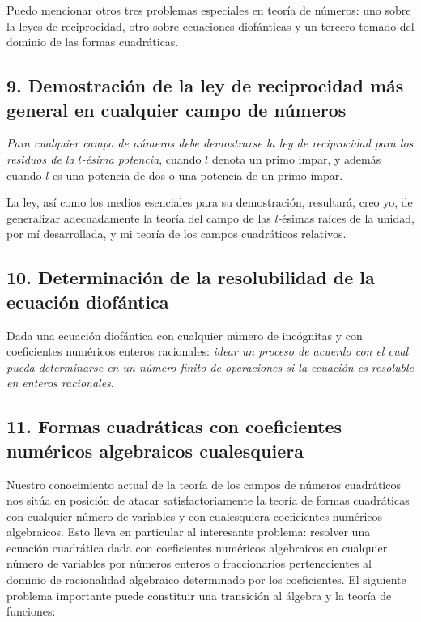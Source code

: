 \documentclass[a4paper, 12pt]{article}
\begin{document}
Puedo mencionar otros tres problemas especiales en teoría de números: uno sobre la leyes de reciprocidad, otro sobre ecuaciones diofánticas y un tercero tomado del dominio de las formas cuadráticas.


\subsection*{9. Demostración de la ley de reciprocidad más general en cualquier campo de números}


\textit{Para cualquier campo de números debe demostrarse la ley de reciprocidad para los residuos de la $l$-ésima potencia}, cuando $l$ denota un primo impar, y además cuando $l$ es una potencia de dos o una potencia de un primo impar.

La ley, así como los medios esenciales para su demostración, resultará, creo yo, de generalizar adecuadamente la teoría del campo de las $l$-ésimas raíces de la unidad, por mí desarrollada, y mi teoría de los campos cuadráticos relativos.

\subsection*{10. Determinación de la resolubilidad de la ecuación diofántica}

Dada una ecuación diofántica con cualquier número de incógnitas y con coeficientes numéricos enteros racionales: \textit{idear un proceso de acuerdo con el cual pueda determinarse en un número finito de operaciones si la ecuación es resoluble en enteros racionales}.

\subsection*{11. Formas cuadráticas con coeficientes numéricos
algebraicos cualesquiera}

Nuestro conocimiento actual de la teoría de los campos de números cua\-drá\-ticos nos sitúa en posición de atacar satisfactoriamente la teoría de formas cuadráticas con cualquier número de variables y con cualesquiera coeficientes numéricos algebraicos. Esto lleva en particular al interesante problema: resolver una ecuación cuadrática dada con coeficientes numéricos algebraicos en cualquier número de variables por números enteros o fraccionarios pertenecientes al dominio de racionalidad algebraico determinado por los coeficientes.
El siguiente problema importante puede constituir una transición al
álgebra y la teoría de funciones:
\end{document}
